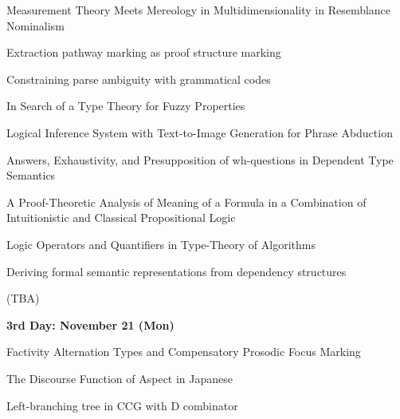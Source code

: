 \documentclass[12pt]{jarticle}
\begin{document}
  
      {Measurement Theory Meets Mereology in Multidimensionality in Resemblance Nominalism}
      {}
  
      {Extraction pathway marking as proof structure marking}
      {}
  
      {Constraining parse ambiguity with grammatical codes}
      {}




  
      {In Search of a Type Theory for Fuzzy Properties}
      {}
  
      {Logical Inference System with Text-to-Image Generation for Phrase Abduction}
      {}
  
      {Answers, Exhaustivity, and Presupposition of wh-questions in Dependent Type Semantics}
      {}




  
      {A Proof-Theoretic Analysis of Meaning of a Formula in a Combination of Intuitionistic and Classical Propositional Logic}
      {}
  
      {Logic Operators and Quantifiers in Type-Theory of Algorithms}
      {}
  
      {Deriving formal semantic representations from dependency structures}
      {}




  
      {(TBA)}
      {}




\noindent\textbf{\large 
3rd Day: November 21 (Mon)
}\\




  
      {Factivity Alternation Types and Compensatory Prosodic Focus Marking}
      {}
  
      {The Discourse Function of Aspect in Japanese}
      {}
  
      {Left-branching tree in CCG with D combinator}
      {}
\end{document}
